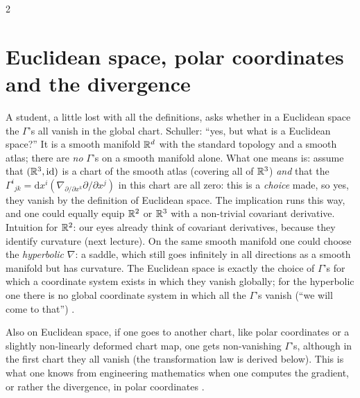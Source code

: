 \begin{paracol}{2}
\section{Euclidean space, polar coordinates and the divergence}\label{sec:c07-euclid}

\begin{coursenote}
A student, a little lost with all the definitions, asks whether in a Euclidean space the $\Gamma$'s all vanish in the global chart. Schuller: ``yes, but what is a Euclidean space?'' It is a smooth manifold $\mathbb{R}^d$ with the standard topology and a smooth atlas; there are \emph{no} $\Gamma$'s on a smooth manifold alone. What one means is: assume that $(\mathbb{R}^3,\mathrm{id})$ is a chart of the smooth atlas (covering all of $\mathbb{R}^3$) \emph{and} that the $\Gamma^i{}_{jk}=\mathrm dx^i(\nabla_{\partial/\partial x^k}\partial/\partial x^j)$ in this chart are all zero: this is a \emph{choice} made, so yes, they vanish by the definition of Euclidean space. The implication runs this way, and one could equally equip $\mathbb{R}^2$ or $\mathbb{R}^3$ with a non-trivial covariant derivative.
Intuition for $\mathbb{R}^2$: our eyes already think of covariant derivatives, because they identify curvature (next lecture). On the same smooth manifold one could choose the \emph{hyperbolic} $\nabla$: a saddle, which still goes infinitely in all directions as a smooth manifold but has curvature. The Euclidean space is exactly the choice of $\Gamma$'s for which a coordinate system exists in which they vanish globally; for the hyperbolic one there is no global coordinate system in which all the $\Gamma$'s vanish (``we will come to that'')
.
\end{coursenote}

Also on Euclidean space, if one goes to another chart, like polar coordinates or a slightly non-linearly deformed chart map, one gets non-vanishing $\Gamma$'s, although in the first chart they all vanish (the transformation law is derived below). This is what one knows from engineering mathematics when one computes the gradient, or rather the divergence, in polar coordinates .


\end{paracol}
